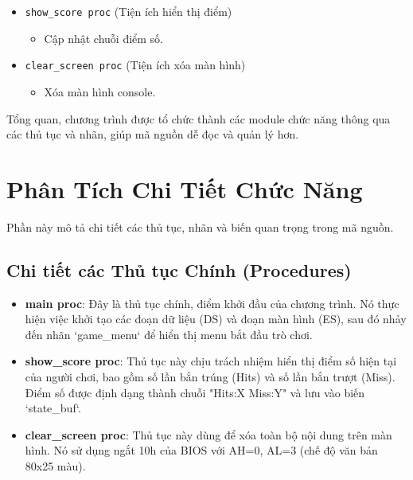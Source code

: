 \documentclass[12pt,a4paper,openany,oneside]{report}
\begin{document}
\begin{itemize}[leftmargin=*, itemsep=1pt, parsep=1pt]
\begin{itemize}
\begin{itemize}
\begin{itemize}
            \end{itemize}
        \end{itemize}
        \item \texttt{show\_score proc} (Tiện ích hiển thị điểm)
        \begin{itemize}
            \item Cập nhật chuỗi điểm số.
        \end{itemize}
        \item \texttt{clear\_screen proc} (Tiện ích xóa màn hình)
        \begin{itemize}
            \item Xóa màn hình console.
        \end{itemize}
    \end{itemize}
\end{itemize}

Tổng quan, chương trình được tổ chức thành các module chức năng thông qua các thủ tục và nhãn, giúp mã nguồn dễ đọc và quản lý hơn.

\chapter{Phân Tích Chi Tiết Chức Năng }
Phần này mô tả chi tiết các thủ tục, nhãn và biến quan trọng trong mã nguồn.

\section{Chi tiết các Thủ tục Chính (Procedures)}
\begin{itemize}
    \item \textbf{main proc}: Đây là thủ tục chính, điểm khởi đầu của chương trình. Nó thực hiện việc khởi tạo các đoạn dữ liệu (DS) và đoạn màn hình (ES), sau đó nhảy đến nhãn `game_menu` để hiển thị menu bắt đầu trò chơi.
    \item \textbf{show\_score proc}: Thủ tục này chịu trách nhiệm hiển thị điểm số hiện tại của người chơi, bao gồm số lần bắn trúng (Hits) và số lần bắn trượt (Miss). Điểm số được định dạng thành chuỗi "Hits:X Miss:Y" và lưu vào biến `state_buf`.
    \item \textbf{clear\_screen proc}: Thủ tục này dùng để xóa toàn bộ nội dung trên màn hình. Nó sử dụng ngắt 10h của BIOS với AH=0, AL=3 (chế độ văn bản 80x25 màu).
\end{itemize}
\end{document}
